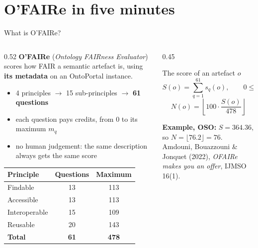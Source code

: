 \documentclass[aspectratio=169,10pt]{beamer}
\newcommand{\evidence}[1]{{\scriptsize\color{epgrey}#1}}
\begin{document}
\section{O'FAIRe in five minutes}

\begin{frame}{What is O'FAIRe?}
  \begin{columns}[T]
    \begin{column}{0.52\textwidth}
      \small
      \textbf{O'FAIRe} (\emph{Ontology FAIRness Evaluator}) scores how FAIR a semantic artefact is,
      using \textbf{its metadata} on an OntoPortal instance.
      \begin{itemize}\setlength{\itemsep}{0pt}
        \item 4 principles $\rightarrow$ 15 sub-principles $\rightarrow$ \textbf{61 questions}
        \item each question pays credits, from 0 to its maximum $m_q$
        \item no human judgement: the same description always gets the same score
      \end{itemize}
      \footnotesize
      \begin{tabular}{@{}l c c@{}}
        \toprule
        Principle & Questions & Maximum\\
        \midrule
        Findable & 13 & 113\\
        Accessible & 13 & 113\\
        Interoperable & 15 & 109\\
        Reusable & 20 & 143\\
        \midrule
        \textbf{Total} & \textbf{61} & \textbf{478}\\
        \bottomrule
      \end{tabular}
    \end{column}
    \begin{column}{0.45\textwidth}
      \begin{block}{The score of an artefact $o$}
        \[ S(o) = \sum_{q=1}^{61} s_q(o), \qquad 0 \le s_q(o) \le m_q \]
        \[ N(o) = \left\lfloor 100 \cdot \frac{S(o)}{478} \right\rfloor \]
      \end{block}
      {\small\textbf{Example, OSO:} $S = 364.36$, so $N = \lfloor 76.2 \rfloor = 76$.}\\[2pt]
      \evidence{Amdouni, Bouazzouni \& Jonquet (2022), \emph{O\textquotesingle FAIRe makes you an offer}, IJMSO 16(1).}
    \end{column}
  \end{columns}
\end{frame}
\end{document}
